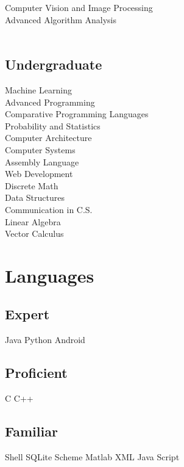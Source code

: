 \documentclass[letterpaper]{deedy-resume} %
\begin{document}
\begin{minipage}[t]{0.30\textwidth}
Computer Vision and Image Processing \\
Advanced Algorithm Analysis \\\
\subsection{Undergraduate}


Machine Learning \\
Advanced Programming \\
Comparative Programming Languages \\
Probability and Statistics \\
Computer Architecture \\ 
Computer Systems \\
Assembly Language \\
Web Development \\
Discrete Math \\
Data Structures \\
Communication in C.S. \\
Linear Algebra \\
Vector Calculus \\


\sectionspace %


\section{Languages}


\subsection{Expert}
Java \textbullet{} Python \textbullet{} Android \\ 
\subsection{Proficient}
C \textbullet{} C++ \\
\subsection{Familiar}
 Shell  \textbullet{} SQLite \textbullet{} Scheme \textbullet{} Matlab \textbullet{} XML \textbullet{} Java Script 


\end{minipage}
\end{document}

